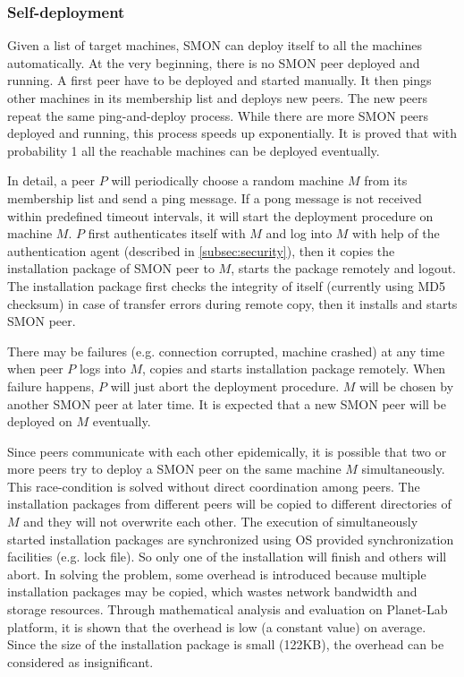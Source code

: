 \subsubsection{Self-deployment}

Given a list of target machines, SMON can deploy itself to
all the machines automatically. At the very beginning, there
is no SMON peer deployed and running. A first peer have
to be deployed and started manually. It then pings other
machines in its membership list and deploys new peers. The
new peers repeat the same ping-and-deploy process. While
there are more SMON peers deployed and running, this process
speeds up exponentially. It is proved that with probability
1 all the reachable machines can be deployed
eventually\cite{Eugster2004}.


In detail, a peer $P$ will periodically choose a random
machine $M$ from its membership list and send a ping
message. If a pong message is not received within predefined
timeout intervals, it will start the deployment procedure on
machine $M$. $P$ first authenticates itself with $M$ and
log into $M$ with help of the authentication agent
(described in \ref{subsec:security}), then it copies the
installation package of SMON peer to $M$, starts the package
remotely and logout. The installation package first
checks the integrity of itself (currently using MD5 checksum)
in case of transfer errors during remote copy, then it
installs and starts SMON peer.

There may be failures (e.g. connection corrupted, machine
crashed) at any time when peer $P$ logs
into $M$, copies and starts installation package remotely.
When failure happens, $P$ will just abort the deployment
procedure. $M$ will be chosen by another SMON peer at later
time. It is expected that a new SMON peer will be deployed
on $M$ eventually.

Since peers communicate with each other epidemically, it is
possible that two or more peers try to deploy a SMON peer on
the same machine $M$ simultaneously. This race-condition is
solved without direct coordination among peers. The
installation packages from different peers will be copied to
different directories of $M$ and they will not overwrite
each other. The execution of simultaneously started
installation packages are synchronized using OS provided
synchronization facilities (e.g. lock file). So only one of
the installation will finish and others will abort.  In
solving the problem, some overhead is introduced because
multiple installation packages may be copied, which wastes
network bandwidth and storage resources. Through
mathematical analysis and evaluation on Planet-Lab platform,
it is shown that the overhead is low (a constant value) on
average. Since the size of the installation package is small
(122KB), the overhead can be considered as insignificant.

